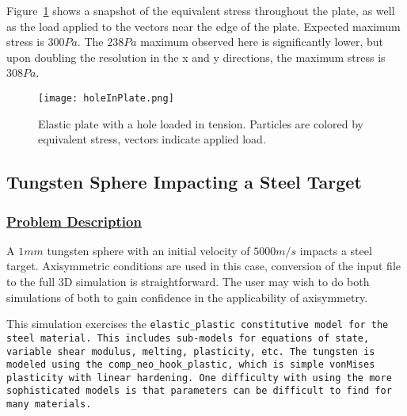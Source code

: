 Figure~\ref{fig:holeInPlate} shows a snapshot of the equivalent stress
throughout the plate, as well as the load applied to the vectors near the
edge of the plate.  Expected maximum stress is $300 Pa$.  The $238 Pa$ maximum
observed here is significantly lower, but upon doubling the resolution in the
x and y directions, the maximum stress is $308 Pa$.
\begin{figure}
  \center
  \texttt{[image: holeInPlate.png]}
  \caption{Elastic plate with a hole loaded in tension.  Particles are
           colored by equivalent stress, vectors indicate applied load.}
  \label{fig:holeInPlate}
\end{figure}
\newpage

\subsection*{\center Tungsten Sphere Impacting a Steel Target}
\subsubsection*{\underline{Problem Description}}
A $1 mm$ tungsten sphere with an initial velocity of $5000 m/s$
impacts a steel target.  Axisymmetric conditions are used in this case,
conversion of the input file to the full 3D simulation is straightforward.
The user may wish to do both simulations of both to gain confidence in the
applicability of axisymmetry. 

This simulation exercises the \tt elastic\_plastic \normalfont
constitutive model for the
steel material. This includes sub-models for equations of state,
variable shear modulus, melting, plasticity, etc.  The tungsten is modeled
using the \tt comp\_neo\_hook\_plastic, \normalfont which is simple vonMises
plasticity with linear hardening.  One difficulty with using the more 
sophisticated models is that parameters can be difficult to find for many
materials.

